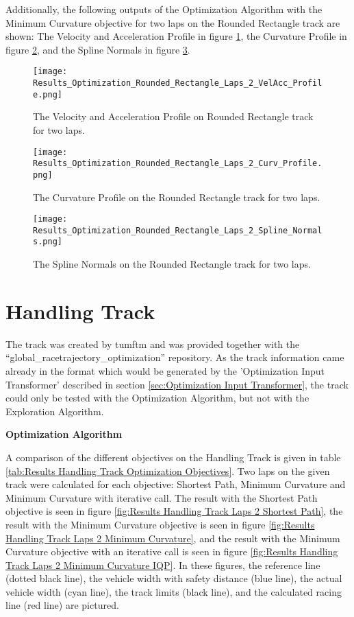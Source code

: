 Additionally, the following outputs of the Optimization Algorithm with the Minimum Curvature objective for two laps on the Rounded Rectangle track are shown: The Velocity and Acceleration Profile in figure \ref{fig:Results Rounded Rectangle Laps 2 VelAcc Profile}, the Curvature Profile in figure \ref{fig:Results Rounded Rectangle Laps 2 Curv Profile}, and the Spline Normals in figure \ref{fig:Results Rounded Rectangle Laps 2 Spline Normals}.
\begin{figure}[H]
    \centering
    \texttt{[image: Results\_Optimization\_Rounded\_Rectangle\_Laps\_2\_VelAcc\_Profile.png]}
    \caption{The Velocity and Acceleration Profile on Rounded Rectangle track for two laps.}
    \label{fig:Results Rounded Rectangle Laps 2 VelAcc Profile}
\end{figure}
\begin{figure}[H]
    \centering
    \texttt{[image: Results\_Optimization\_Rounded\_Rectangle\_Laps\_2\_Curv\_Profile.png]}
    \caption{The Curvature Profile on the Rounded Rectangle track for two laps.}
    \label{fig:Results Rounded Rectangle Laps 2 Curv Profile}
\end{figure}
\begin{figure}[H]
    \centering
    \texttt{[image: Results\_Optimization\_Rounded\_Rectangle\_Laps\_2\_Spline\_Normals.png]}
    \caption{The Spline Normals on the Rounded Rectangle track for two laps.}
    \label{fig:Results Rounded Rectangle Laps 2 Spline Normals}
\end{figure}

\section{Handling Track} \label{sec:Results Handling Track}
The track was created by \acrshort{tumftm} and was provided together with the ``global\_racetrajectory\_optimization'' repository. \cite{tumftm_optimization_algoritm}
As the track information came already in the format which would be generated by the 'Optimization Input Transformer' described in section \ref{sec:Optimization Input Transformer}, the track could only be tested with the Optimization Algorithm, but not with the Exploration Algorithm.

\textbf{Optimization Algorithm}

A comparison of the different objectives on the Handling Track is given in table \ref{tab:Results Handling Track Optimization Objectives}. Two laps on the given track were calculated for each objective: Shortest Path, Minimum Curvature and Minimum Curvature with iterative call. The result with the Shortest Path objective is seen in figure \ref{fig:Results Handling Track Laps 2 Shortest Path}, the result with the Minimum Curvature objective is seen in figure \ref{fig:Results Handling Track Laps 2 Minimum Curvature}, and the result with the Minimum Curvature objective with an iterative call is seen in figure \ref{fig:Results Handling Track Laps 2 Minimum Curvature IQP}. In these figures, the reference line (dotted black line), the vehicle width with safety distance (blue line), the actual vehicle width (cyan line), the track limits (black line), and the calculated racing line (red line) are pictured.

